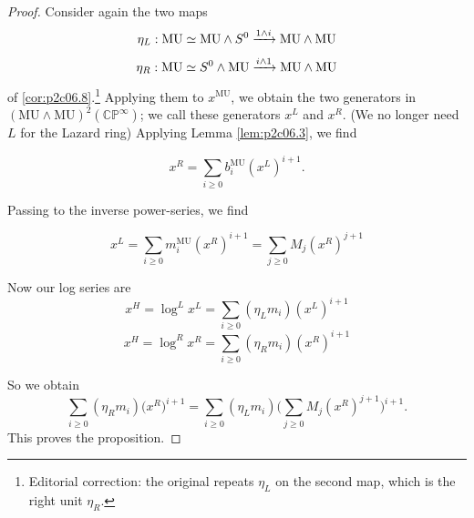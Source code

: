 \documentclass[../main]{subfiles}
\begin{document}
\begin{proof}
Consider again the two maps \[\eta_L : \mathrm{MU} \simeq \mathrm{MU} \wedge S^0 \lar{1 \wedge i} \mathrm{MU} \wedge \mathrm{MU}\] 
\[\eta_R : \mathrm{MU} \simeq S^0 \wedge \mathrm{MU} \lar{i \wedge 1} \mathrm{MU} \wedge \mathrm{MU}\]
of \eqref{cor:p2c06.8}.\footnote{Editorial correction: the original repeats $\eta_L$ on the second map, which is the right unit $\eta_R$.} Applying them to $x^{\mathrm{MU}}$, we obtain the two generators in $(\mathrm{MU} \wedge \mathrm {MU})^2 (\mathbb {CP}^\infty)$; we call these generators $x^L$ and $x^R$. (We no longer need $L$ for the Lazard ring) Applying Lemma \ref{lem:p2c06.3}, we find

\begin{equation}
\label{eqn:p2c09.5}
\tag{9.5}
x^R = \sum_{i \ge 0} b_i^{\mathrm{MU}} (x^L)^{i + 1}.
\end{equation}

Passing to the inverse power-series, we find

\begin{equation}
\label{eqn:p2c09.6}
\tag{9.6}
x^L = \sum_{i \ge 0} m_i^{\mathrm{MU}} (x^R)^{i + 1} = \sum_{j \ge 0} M_j (x^R)^{j + 1}
\end{equation}

Now our log series are
\[x^H = \log^L x^L = \sum_{i \ge 0} (\eta_L m_i) (x^L)^{i + 1}\]
\[x^H = \log^R x^R = \sum_{i \ge 0} (\eta_R m_i) (x^R)^{i + 1}\]

So we obtain \[\sum_{i \ge 0} (\eta_R m_i) \big(x^R\big)^{i + 1} = \sum_{i \ge 0} (\eta_L m_i) \bigg(\sum_{j \ge 0} M_j (x^R)^{j + 1}\bigg)^{i + 1}.\]
This proves the proposition.
\end{proof}
\end{document}
